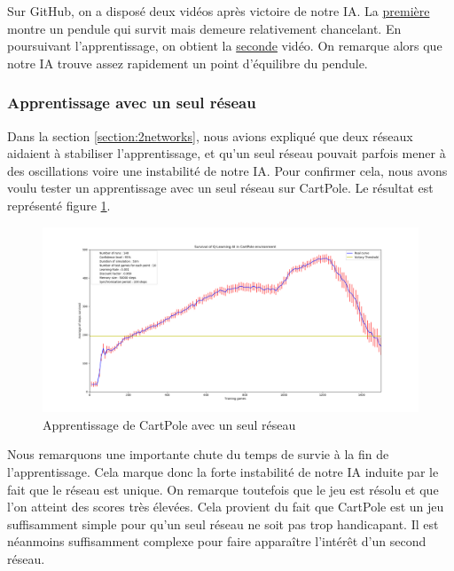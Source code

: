 Sur GitHub, on a disposé deux vidéos après victoire de notre IA. La 
\href{https://raw.githubusercontent.com/ready-player-one-supelec/eponge-rapport/master/videos/balance.mp4}{première} 
montre un pendule qui survit mais demeure relativement chancelant. En poursuivant
l'apprentissage, on obtient la \href{https://raw.githubusercontent.com/ready-player-one-supelec/eponge-rapport/master/videos/equilibre.mp4}{seconde} vidéo. 
On remarque alors que notre IA trouve assez rapidement un point d'équilibre du pendule.

\subsubsection{Apprentissage avec un seul réseau}

Dans la section \ref{section:2networks}, nous avions expliqué que deux réseaux aidaient à stabiliser l'apprentissage, et qu'un seul réseau pouvait parfois mener à des
oscillations voire une instabilité de notre IA. Pour confirmer cela, nous avons voulu tester un apprentissage avec un seul réseau sur CartPole.
Le résultat est représenté figure \ref{fig:cartpole-1reseau}.

\begin{figure}[h]
 \centering
 \includegraphics[width = \textwidth]{img/cartpole_1reseau.png}
 \caption{Apprentissage de CartPole avec un seul réseau}
 \label{fig:cartpole-1reseau}
\end{figure}

Nous remarquons une importante chute du temps de survie à la fin de l'apprentissage. Cela marque donc la forte instabilité de notre IA induite par le fait que le réseau
est unique. On remarque toutefois que le jeu est résolu et que l'on atteint des scores très élevées. Cela provient du fait que CartPole est un jeu suffisamment simple
pour qu'un seul réseau ne soit pas trop handicapant. Il est néanmoins suffisamment complexe pour faire apparaître l'intérêt d'un second réseau.


